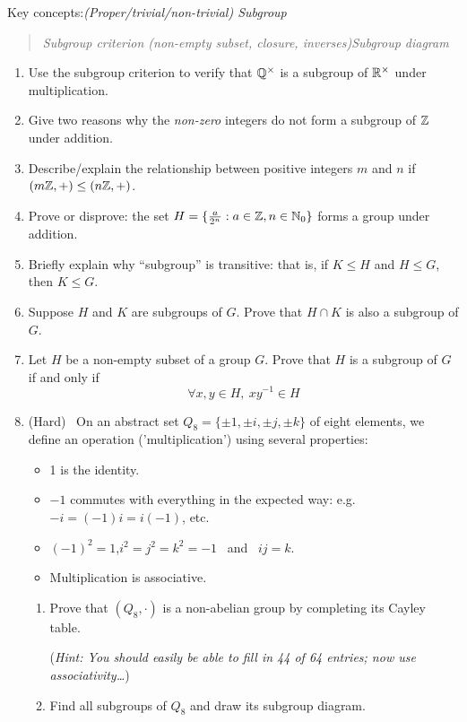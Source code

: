 \begin{exercises}
	Key concepts:\quad \emph{(Proper/trivial/non-trivial) Subgroup}
	\begin{quote}
		\emph{Subgroup criterion (non-empty subset, closure, inverses)\qquad Subgroup diagram}
	\end{quote}
	
	
	\begin{enumerate}
	  \item Use the subgroup criterion to verify that $\mathbb{Q}^\times$ is a subgroup of $\mathbb{R}^\times$ under multiplication.
	  
	  
		\item Give two reasons why the \emph{non-zero} integers do not form a subgroup of $\mathbb{Z}$ under addition.
	  	
	  	
	  \item Describe/explain the relationship between positive integers $m$ and $n$ if $(m\mathbb{Z},+)\le (n\mathbb{Z},+)$.
	

	  \item Prove or disprove: the set $H=\{\frac a{2^n}:a\in\mathbb{Z},n\in\mathbb{N}_0\}$ forms a group under addition.
	    	  
	  
	  \item Briefly explain why ``subgroup'' is transitive: that is, if $K\le H$ and $H\le G$, then $K\le G$.
	  
	  
		\item Suppose $H$ and $K$ are subgroups of $G$. Prove that $H\cap K$ is also a subgroup of $G$.
	   
	   
		\item Let $H$ be a non-empty subset of a group $G$. Prove that $H$ is a subgroup of $G$ if and only if
	  \[
	  	\forall x,y\in H,\ xy^{-1}\in H
	  \]
	  
	  
	 	\item\label{exs:quaternion} (Hard) \ On an abstract set $Q_8=\{\pm 1,\pm i,\pm j,\pm k\}$ of eight elements, we define an operation ('multiplication') using several properties:
	  \begin{itemize}
	    \item 1 is the identity.
	    \item $-1$ commutes with everything in the expected way: e.g.\ $-i=(-1)i=i(-1)$, etc.
	    \item $(-1)^2=1$,\quad $i^2=j^2=k^2=-1$ \ and \ $ij=k$.
	    \item Multiplication is associative.
	  \end{itemize}
	  \begin{enumerate}
	    \item Prove that $(Q_8,\cdot)$ is a non-abelian group by completing its Cayley table.\par
	  	(\emph{Hint: You should easily be able to fill in 44 of 64 entries; now use associativity\ldots})
	  
	  	\item Find all subgroups of $Q_8$ and draw its subgroup diagram.
		\end{enumerate}
	 
	\end{enumerate}
\end{exercises}


